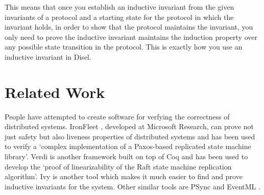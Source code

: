 This means that once you establish an inductive invariant from the given invariants
of a protocol and a starting state for the protocol in which the invariant holds,
in order to show that the protocol maintains the invariant, you only need to
prove the inductive invariant maintains the induction property over any possible state
transition in the protocol. This is exactly how you use an inductive invariant in
Disel.


\section{Related Work}
People have attempted to create software for verfying the correctness of distributed
systems. IronFleet \cite{15}, developed at Microsoft Research, can prove not just
safety but also liveness properties of distributed systems and has been used
to verify a `complex implementation of a Paxos-based replicated state machine
library'. Verdi \cite{16} is another framework built on top of Coq and has been used
to develop the `proof of linearizability of the Raft state machine replication
algorithm'. Ivy \cite{19} is another tool which makes it much easier to find and
prove inductive invariants for the system. Other similar tools are PSync \cite{17}
and EventML \cite{18}.
